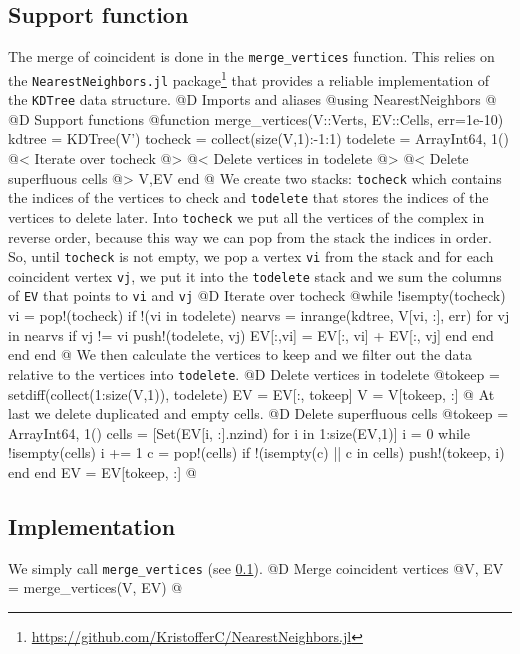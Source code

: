 \documentclass[10pt,oneside]{article}
\begin{document}
\subsection{Support function}
\label{sec:merge_vertices}
The merge of coincident is done in the \texttt{merge\_vertices}
function. This relies on the \texttt{NearestNeighbors.jl}
package\footnote{\url{https://github.com/KristofferC/NearestNeighbors.jl}}
that provides a reliable implementation of the \texttt{KDTree} data structure.
@D Imports and aliases
@{using NearestNeighbors
@}
@D Support functions
@{function merge_vertices(V::Verts, EV::Cells, err=1e-10)
    kdtree = KDTree(V')
    tocheck = collect(size(V,1):-1:1)
    todelete = Array{Int64, 1}()
    @< Iterate over tocheck @>
    @< Delete vertices in todelete @>
    @< Delete superfluous cells @>
    V,EV
end
@}
We create two stacks: \texttt{tocheck} which contains the indices of the vertices
to check and \texttt{todelete} that stores the indices of the vertices to delete later.
Into \texttt{tocheck} we put all the vertices of the complex in reverse order, because
this way we can pop from the stack the indices in order. So, until \texttt{tocheck} is not empty,
we pop a vertex \texttt{vi} from the stack and for each coincident vertex \texttt{vj}, we put it 
into the \texttt{todelete} stack and we sum the columns of \texttt{EV} that points to \texttt{vi} and \texttt{vj}
@D Iterate over tocheck 
@{while !isempty(tocheck)
    vi = pop!(tocheck)
    if !(vi in todelete)
        nearvs = inrange(kdtree, V[vi, :], err)
        for vj in nearvs
            if vj != vi
                push!(todelete, vj)
                EV[:,vi] = EV[:, vi] + EV[:, vj]
            end
        end
    end
end
@}
We then calculate the vertices to keep and we filter out
the data relative to the vertices into \texttt{todelete}.
@D Delete vertices in todelete
@{tokeep = setdiff(collect(1:size(V,1)), todelete)
EV = EV[:, tokeep]
V = V[tokeep, :]
@}
At last we delete duplicated and empty cells.
@D Delete superfluous cells
@{tokeep = Array{Int64, 1}()
cells = [Set(EV[i, :].nzind) for i in 1:size(EV,1)]
i = 0
while !isempty(cells)
    i += 1
    c = pop!(cells)
    if !(isempty(c) || c in cells)
        push!(tokeep, i)
    end
end
EV = EV[tokeep, :]
@}
\subsection{Implementation}
We simply call \texttt{merge\_vertices} (see \ref{sec:merge_vertices}).
@D Merge coincident vertices
@{V, EV = merge_vertices(V, EV)
@}
\end{document}
